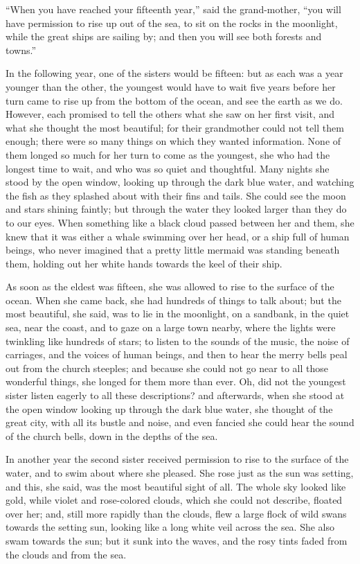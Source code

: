 ``When you have reached your fifteenth year,'' said the grand-mother, ``you will have permission to rise up out of the sea, to sit on the rocks in the moonlight, while the great ships are sailing by; and then you will see both forests and towns.''

In the following year, one of the sisters would be fifteen: but as each was a year younger than the other, the youngest would have to wait five years before her turn came to rise up from the bottom of the ocean, and see the earth as we do.
However, each promised to tell the others what she saw on her first visit, and what she thought the most beautiful; for their grandmother could not tell them enough; there were so many things on which they wanted information.
None of them longed so much for her turn to come as the youngest, she who had the longest time to wait, and who was so quiet and thoughtful.
Many nights she stood by the open window, looking up through the dark blue water, and watching the fish as they splashed about with their fins and tails.
She could see the moon and stars shining faintly; but through the water they looked larger than they do to our eyes.
When something like a black cloud passed between her and them, she knew that it was either a whale swimming over her head, or a ship full of human beings, who never imagined that a pretty little mermaid was standing beneath them, holding out her white hands towards the keel of their ship.

As soon as the eldest was fifteen, she was allowed to rise to the surface of the ocean.
When she came back, she had hundreds of things to talk about; but the most beautiful, she said, was to lie in the moonlight, on a sandbank, in the quiet sea, near the coast, and to gaze on a large town nearby, where the lights were twinkling like hundreds of stars; to listen to the sounds of the music, the noise of carriages, and the voices of human beings, and then to hear the merry bells peal out from the church steeples; and because she could not go near to all those wonderful things, she longed for them more than ever.
Oh, did not the youngest sister listen eagerly to all these descriptions? and afterwards, when she stood at the open window looking up through the dark blue water, she thought of the great city, with all its bustle and noise, and even fancied she could hear the sound of the church bells, down in the depths of the sea.

In another year the second sister received permission to rise to the surface of the water, and to swim about where she pleased.
She rose just as the sun was setting, and this, she said, was the most beautiful sight of all.
The whole sky looked like gold, while violet and rose-colored clouds, which she could not describe, floated over her; and, still more rapidly than the clouds, flew a large flock of wild swans towards the setting sun, looking like a long white veil across the sea.
She also swam towards the sun; but it sunk into the waves, and the rosy tints faded from the clouds and from the sea.

